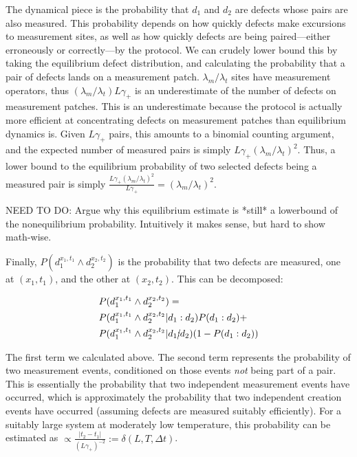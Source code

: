 \documentclass[twocolumn,superscriptaddress,aps,prb,floatfix]{revtex4-1}
\begin{document}
The dynamical piece is the probability that $d_1$ and $d_2$ are defects whose pairs are also measured.  This probability depends on how quickly defects make excursions to measurement sites, as well as how quickly defects are being paired---either erroneously or correctly---by the protocol.  We can crudely lower bound this by taking the equilibrium defect distribution, and calculating the probability that a pair of defects lands on a measurement patch.  $\lambda_m / \lambda_t$ sites have measurement operators, thus $(\lambda_m / \lambda_t) L \gamma_+$ is an underestimate of the number of defects on measurement patches.  This is an underestimate because the protocol is actually more efficient at concentrating defects on measurement patches than equilibrium dynamics is.  Given $L \gamma_+$ pairs, this amounts to a binomial counting argument, and the expected number of measured pairs is simply $L \gamma_+ (\lambda_m / \lambda_t)^2$.  Thus, a lower bound to the equilibrium probability of two selected defects being a measured pair is simply $\frac{L \gamma_+(\lambda_m / \lambda_t)^2}{L \gamma_+} = (\lambda_m / \lambda_t)^2$.

NEED TO DO: Argue why this equilibrium estimate is *still* a lowerbound of the nonequilibrium probability.  Intuitively it makes sense, but hard to show math-wise.

Finally, $P(d_1^{x_1,t_1}\wedge d_2^{x_2,t_2})$ is the probability that two defects are measured, one at $(x_1,t_1)$, and the other at $(x_2,t_2)$.  This can be decomposed:

\begin{align}
&P(d_1^{x_1,t_1}\wedge d_2^{x_2,t_2}) = \\ \notag
&P(d_1^{x_1,t_1} \wedge d_2^{x_2,t_2} | d_1:d_2) P(d_1 : d_2) + \\ \notag 
&P(d_1^{x_1,t_1} \wedge d_2^{x_2,t_2} | d_1\cancel{:}d_2) (1 - P(d_1 : d_2))
\end{align}

The first term we calculated above.  The second term represents the probability of two measurement events, conditioned on those events \emph{not} being part of a pair.  This is essentially the probability that two independent measurement events have occurred, which is approximately the probability that two independent creation events have occurred (assuming defects are measured suitably efficiently).  For a suitably large system at moderately low temperature, this probability can be estimated as $\propto \frac{|t_2-t_1|}{(L \gamma_+)^{-2}}:=\delta(L,T,\Delta t)$.
\end{document}
